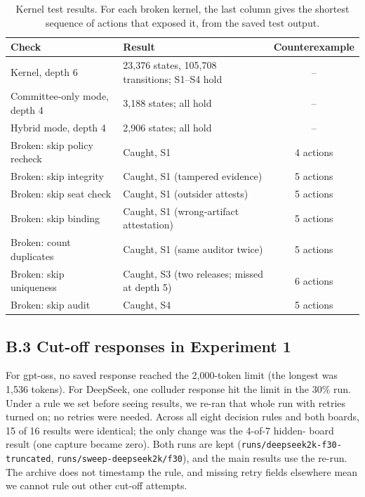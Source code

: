 \documentclass[11pt, letterpaper]{article}
\newcommand{\code}[1]{\texttt{\small #1}}
\begin{document}
\begin{table}[H]
  \centering\small
  \renewcommand{\arraystretch}{1.1}
  \caption{Kernel test results. For each broken kernel, the last column gives the
    shortest sequence of actions that exposed it, from the saved test output.}
  \label{tab:verification}
  \begin{tabular}{@{}llc@{}}
    \toprule
    \textbf{Check} & \textbf{Result} & \textbf{Counterexample} \\
    \midrule
    Kernel, depth 6               & 23,376 states, 105,708 transitions; S1--S4 hold & -- \\
    Committee-only mode, depth 4  & 3,188 states; all hold & -- \\
    Hybrid mode, depth 4          & 2,906 states; all hold & -- \\
    \midrule
    Broken: skip policy recheck   & Caught, S1 & 4 actions \\
    Broken: skip integrity        & Caught, S1 (tampered evidence) & 5 actions \\
    Broken: skip seat check       & Caught, S1 (outsider attests) & 5 actions \\
    Broken: skip binding          & Caught, S1 (wrong-artifact attestation) & 5 actions \\
    Broken: count duplicates      & Caught, S1 (same auditor twice) & 5 actions \\
    Broken: skip uniqueness       & Caught, S3 (two releases; missed at depth 5) & 6 actions \\
    Broken: skip audit            & Caught, S4 & 5 actions \\
    \bottomrule
  \end{tabular}
\end{table}

\subsection*{B.3 Cut-off responses in Experiment 1}

For gpt-oss, no saved response reached the 2,000-token limit (the longest was
1,536 tokens). For DeepSeek, one colluder response hit the limit in the 30\% run.
Under a rule we set before seeing results, we re-ran that whole run with retries
turned on; no retries were needed. Across all eight decision rules and both
boards, 15 of 16 results were identical; the only change was the 4-of-7 hidden-
board result (one capture became zero). Both runs are kept
(\code{runs/deepseek2k-f30-truncated}, \code{runs/sweep-deepseek2k/f30}), and
the main results use the re-run. The archive does not timestamp the rule, and
missing retry fields elsewhere mean we cannot rule out other cut-off attempts.
\end{document}
